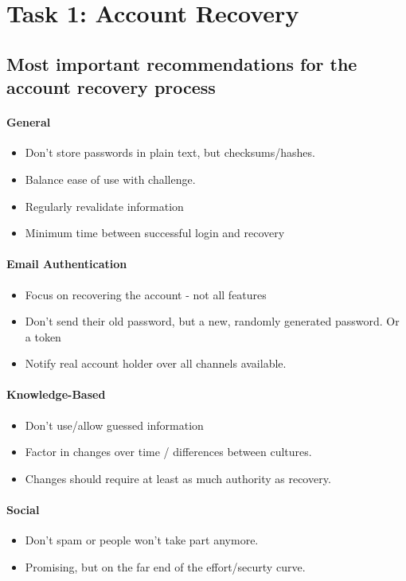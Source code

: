 \section{Task 1: Account Recovery}

\subsection{Most important recommendations for the account recovery process}

\paragraph{General}
\begin{itemize}
	\item Don't store passwords in plain text, but checksums/hashes.
	\item Balance ease of use with challenge.
	\item Regularly revalidate information
	\item Minimum time between successful login and recovery
\end{itemize}

\paragraph{Email Authentication}
\begin{itemize}
	\item Focus on recovering the account - not all features
	\item Don't send their old password, but a new, randomly generated password. Or a token
	\item Notify real account holder over all channels available.
\end{itemize}

\paragraph{Knowledge-Based}
\begin{itemize}
	\item Don't use/allow guessed information
	\item Factor in changes over time / differences between cultures.
	\item Changes should require at least as much authority as recovery.
\end{itemize}

\paragraph{Social}
\begin{itemize}
	\item Don't spam or people won't take part anymore.
	\item Promising, but on the far end of the effort/securty curve.
\end{itemize}

